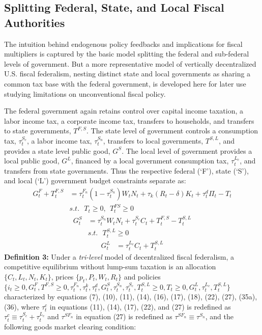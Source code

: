 \documentclass[12pt,letterpaper]{article}
\begin{document}
\subsection{Splitting Federal, State, and Local Fiscal Authorities}
The intuition behind endogenous policy feedbacks and implications for fiscal multipliers is captured by the basic model splitting the federal and sub-federal levels of government. But a more representative model of vertically decentralized U.S. fiscal federalism, nesting distinct state and local governments as sharing a common tax base with the federal government, is developed here for later use studying limitations on unconventional fiscal policy. 
 
The federal government again retains control over capital income taxation, a labor income tax, a corporate income tax, transfers to households, and transfers to state governments, $T^{F,S}$. The state level of government controls a consumption tax, $\tau_t^{S_c}$, a labor income tax, $\tau_t^{S_n}$, transfers to local governments, $T^{S,L}$, and provides a state level public good, $G^S$. The local level of government provides a local public good, $G^L$, financed by a local government consumption tax, $\tau_t^{L_c}$, and transfers from state governments. Thus the respective federal (`F'), state (`S'), and local (`L') government budget constraints separate as:
\begin{subequations} 
\begin{align}
G^F_t + T^{F,S}_t &= \tau^{F_n}_t (1 - \tau^{S_n}_t) W_t N_t + \tau_k (R_t - \delta) K_t  + \tau_t^d \Pi_t - T_t \\  
& s.t. \ \ \ T_t \geq 0, \ \ T^{FS}_t \geq 0
\end{align}
\end{subequations}
\begin{subequations}  
\begin{align}
G^S_t &= \tau^{S_n}_t W_t N_t + \tau_t^{S_c} C_t  + T^{F,S}_t - T^{S,L}_t \\
& s.t. \ \ \ T^{S,L}_t \geq 0
\end{align}
\end{subequations} 
\begin{align}
G^L_t &=  \tau_t^{L_c} C_t  + T^{S,L}_t 
\end{align}
\noindent \textbf{Definition 3: } Under a \textit{tri-level} model of decentralized fiscal federalism, a competitive equilibrium without lump-sum taxation is an allocation $\{C_t, L_t, N_t, K_t\}$, prices $\{p_t, P_t, W_t, R_t\}$ and policies $\{i_t \geq 0, G^F_t, T^{F,S} \geq 0, \tau_t^{F_n}, \tau_t^k, \tau_t^d, G^S_t, \tau_t^{S_n}, \tau_t^{S_c}, T^{S,L}_t \geq 0, T_t \geq 0, G^L_t, \tau_t^{L_c}, T^{S,L}_t \}$ characterized by equations (7), (10), (11), (14), (16), (17), (18), (22), (27), (35a), (36), where $\tau_t^c$ in equations (11), (14), (17), (22), and (27) is redefined as $\tau_t^c \equiv \tau_t^{S_c} + \tau_t^{L_c}$ and $\tau^{{SF}_n}$ in equation (27) is redefined as $\tau^{{SF}_n} \equiv \tau^{{S_n}}$, and the following goods market clearing condition:
\end{document}
